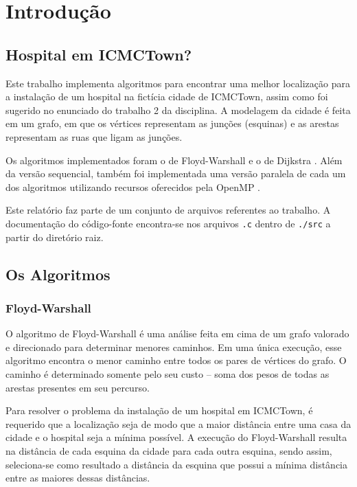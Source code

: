 \section{Introdução}

\subsection{Hospital em ICMCTown?}

Este trabalho implementa algoritmos para encontrar uma melhor localização para a instalação de um hospital na fictícia cidade de ICMCTown, assim como foi sugerido no enunciado do trabalho 2 da disciplina. A modelagem da cidade é feita em um grafo, em que os vértices representam as junções (esquinas) e as arestas representam as ruas que ligam as junções.

Os algoritmos implementados foram o de Floyd-Warshall \cite{floyd} e o de  Dijkstra \cite{dijkstra}. Além da versão sequencial, também foi implementada uma versão paralela de cada um dos algoritmos utilizando recursos oferecidos pela OpenMP \cite{openmp}.

Este relatório faz parte de um conjunto de arquivos referentes ao trabalho. A documentação do código-fonte encontra-se nos arquivos \texttt{.c} dentro de \texttt{./src} a partir do diretório raiz.

\subsection{Os Algoritmos}

\subsubsection{Floyd-Warshall}

O algoritmo de Floyd-Warshall é uma análise feita em cima de um grafo valorado e direcionado para determinar menores caminhos. Em uma única execução, esse algoritmo encontra o menor caminho entre todos os pares de vértices do grafo. O caminho é determinado somente pelo seu custo -- soma dos pesos de todas as arestas presentes em seu percurso.

Para resolver o problema da instalação de um hospital em ICMCTown, é requerido que a localização seja de modo que a maior distância entre uma casa da cidade e o hospital seja a mínima possível. A execução do Floyd-Warshall resulta na distância de cada esquina da cidade para cada outra esquina, sendo assim, seleciona-se como resultado a distância da esquina que possui a mínima distância entre as maiores dessas distâncias.

